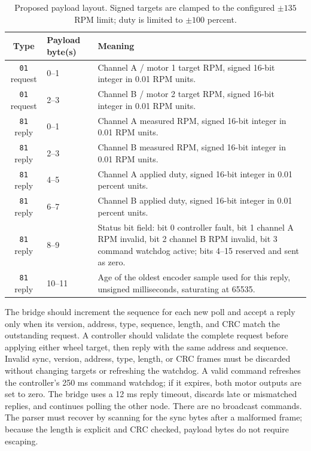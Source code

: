 \begin{table}[!htbp]
    \centering
    \small
    \begin{tabular}{clp{8.2cm}}
        \toprule
        \textbf{Type} & \textbf{Payload byte(s)} & \textbf{Meaning} \\
        \midrule
        \texttt{01} request & 0--1 & Channel A / motor 1 target RPM, signed 16-bit integer in 0.01 RPM units. \\
        \texttt{01} request & 2--3 & Channel B / motor 2 target RPM, signed 16-bit integer in 0.01 RPM units. \\
        \texttt{81} reply & 0--1 & Channel A measured RPM, signed 16-bit integer in 0.01 RPM units. \\
        \texttt{81} reply & 2--3 & Channel B measured RPM, signed 16-bit integer in 0.01 RPM units. \\
        \texttt{81} reply & 4--5 & Channel A applied duty, signed 16-bit integer in 0.01 percent units. \\
        \texttt{81} reply & 6--7 & Channel B applied duty, signed 16-bit integer in 0.01 percent units. \\
        \texttt{81} reply & 8--9 & Status bit field: bit 0 controller fault, bit 1 channel A RPM invalid, bit 2 channel B RPM invalid, bit 3 command watchdog active; bits 4--15 reserved and sent as zero. \\
        \texttt{81} reply & 10--11 & Age of the oldest encoder sample used for this reply, unsigned milliseconds, saturating at 65535. \\
        \bottomrule
    \end{tabular}
    \caption{Proposed payload layout. Signed targets are clamped to the configured $\pm135$ RPM limit; duty is limited to $\pm100$ percent.}
    \label{tab:rs485_payload}
\end{table}

The bridge should increment the sequence for each new poll and accept a reply only when its version, address, type, sequence, length, and CRC match the outstanding request. A controller should validate the complete request before applying either wheel target, then reply with the same address and sequence. Invalid sync, version, address, type, length, or CRC frames must be discarded without changing targets or refreshing the watchdog. A valid command refreshes the controller's 250 ms command watchdog; if it expires, both motor outputs are set to zero. The bridge uses a 12 ms reply timeout, discards late or mismatched replies, and continues polling the other node. There are no broadcast commands. The parser must recover by scanning for the sync bytes after a malformed frame; because the length is explicit and CRC checked, payload bytes do not require escaping.

